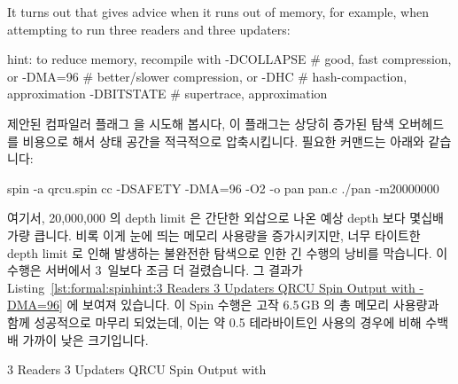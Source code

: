 It turns out that  gives advice when it runs out of memory,
for example, when attempting to run three readers and three updaters:
\fi

\begin{VerbatimU}
hint: to reduce memory, recompile with
  -DCOLLAPSE # good, fast compression, or
  -DMA=96   # better/slower compression, or
  -DHC # hash-compaction, approximation
  -DBITSTATE # supertrace, approximation
\end{VerbatimU}

제안된 컴파일러 플래그  을 시도해 봅시다, 이 플래그는 상당히 증가된
탐색 오버헤드를 비용으로 해서 상태 공간을 적극적으로 압축시킵니다.
필요한 커맨드는 아래와 같습니다:
\iffalse

Let's try the suggested compiler flag \co{-DMA=N},
which generates code for aggressive compression of the
state space at the cost of greatly increased search overhead.
The required commands are as follows:
\fi

\begin{VerbatimU}
spin -a qrcu.spin
cc -DSAFETY -DMA=96 -O2 -o pan pan.c
./pan -m20000000
\end{VerbatimU}

여기서, 20,000,000 의 depth limit 은 간단한 외삽으로 나온 예상 depth 보다
몇십배 가량 큽니다.
비록 이게 눈에 띄는 메모리 사용량을 증가시키지만, 너무 타이트한 depth limit 로
인해 발생하는 불완전한 탐색으로 인한 긴 수행의 낭비를 막습니다.
이 수행은  서버에서 3~일보다 조금 더 걸렸습니다.
그 결과가
Listing~\ref{lst:formal:spinhint:3 Readers 3 Updaters QRCU Spin Output with -DMA=96}
에 보여져 있습니다.
이 Spin 수행은 고작 6.5\,GB 의 총 메모리 사용량과 함께 성공적으로 마무리
되었는데, 이는 약 0.5 테라바이트인  사용의 경우에 비해 수백배
가까이 낮은 크기입니다.
\iffalse

Here, the depth limit of 20,000,000 is an order of magnitude
larger than the expected depth deduced from simple extrapolation.
Although this increases up-front memory usage, it avoids wasting
a long run due to incomplete search resulting from a too-tight
depth limit.
This run took a little more than 3~days on a \Power{9} server.
The result is shown in
Listing~\ref{lst:formal:spinhint:3 Readers 3 Updaters QRCU Spin Output with -DMA=96}.
This Spin run completed successfully with a total memory
usage of only 6.5\,GB, which is almost two orders of magnitude
lower than the \co{-DCOLLAPSE} usage of about half a terabyte.
\fi

\begin{listing}
\vspace*{-9pt}
\caption{3 Readers 3 Updaters QRCU Spin Output with }
\label{lst:formal:spinhint:3 Readers 3 Updaters QRCU Spin Output with -DMA=96}
\end{listing}


